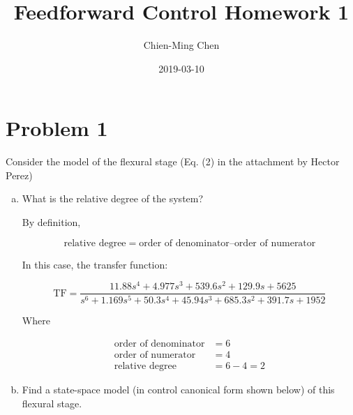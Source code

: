 \documentclass[12pt]{article}
\title{Feedforward Control Homework 1}
\date{2019-03-10}
\author{Chien-Ming Chen}
\begin{document}
  \maketitle

  \section{Problem 1}
  Consider the model of the flexural stage (Eq. (2) in the attachment by Hector Perez)

  \begin{enumerate}[(a)]
    \item What is the relative degree of the system?

    By definition,

    \begin{equation}
      \text{relative degree} = \text{order of denominator} – \text{order of numerator}
    \end{equation}

    In this case, the transfer function:

    \begin{equation}
      \text{TF} = \frac{11.88 s^4 + 4.977 s^3 + 539.6 s^2 + 129.9 s + 5625}{s^6 + 1.169 s^5 + 50.3 s^4 + 45.94 s^3 + 685.3 s^2 + 391.7 s + 1952}
    \end{equation}

    Where

    \begin{align*}
      \text{order of denominator} &= 6 \\
      \text{order of numerator} &= 4 \\
      \text{relative degree} &= 6 - 4 = 2
    \end{align*}

    \clearpage

    \item Find a state-space model (in control canonical form shown below) of this flexural stage.


\end{enumerate}
\end{document}
